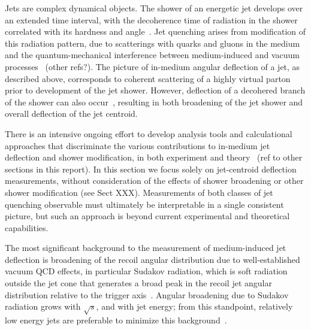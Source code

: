 Jets are complex dynamical objects. The shower of an energetic jet develops over an extended time interval, with the decoherence time of radiation in the shower  correlated with its hardness and angle~\cite{Andrews:2018jcm}. Jet quenching arises from modification of this radiation pattern, due to scatterings with quarks and gluons in the medium and the quantum-mechanical interference between medium-induced and vacuum processes~\cite{Andrews:2018jcm} (other refs?). The picture of in-medium angular deflection of a jet, as described above, corresponds to coherent scattering of a highly virtual parton prior to development of the jet shower. However, deflection of a decohered branch of the shower can also occur~\cite{DEramo:2018eoy}, resulting in both broadening of the jet shower and overall deflection of the jet centroid. 

There is an intensive ongoing effort to develop analysis tools and calculational approaches that discriminate the various contributions to in-medium jet deflection and shower modification, in both experiment and theory~\cite{Andrews:2018jcm} (ref to other sections in this report). In this section we focus solely on jet-centroid deflection measurements, without consideration of the effects of shower broadening or other shower modification (see Sect XXX). Measurements of both classes of jet quenching observable must ultimately be interpretable in a single consistent picture, but such an approach is beyond current experimental and theoretical capabilities.

The most significant background to the measurement of medium-induced jet deflection is broadening of the recoil angular distribution due to well-established vacuum QCD effects, in particular Sudakov radiation, which is soft radiation outside the jet cone that generates a broad peak in the recoil jet angular distribution relative to the trigger axis~\cite{Chen:2016vem,Mueller:2016xoc}. Angular broadening due to Sudakov radiation grows with $\sqrt{s}$, and with jet energy; from this standpoint, relatively low energy jets are preferable to minimize this background~\cite{Chen:2016vem}.

